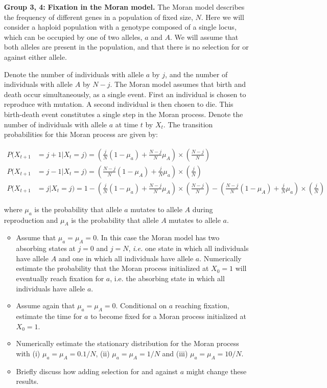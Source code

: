 \documentclass[12pt]{article}
\begin{document}
\begin{enumerate}
\item[\bf Group 3, 4:] {\bf Fixation in the Moran model.}  The Moran model describes the frequency of different genes in a population of fixed size, $N$.
Here we will consider a haploid population with a genotype composed of a single locus, which can be occupied by one of two alleles, $a$ and $A$. We will assume that both alleles are present in the population, and that there is no selection for or against either allele.

Denote the number of individuals with allele $a$ by $j$, and the number of individuals with allele $A$ by $N-j$. The Moran model assumes that birth and death occur simultaneously, as a single event. First an individual is chosen to reproduce with mutation. A second individual is then chosen to die. This birth-death event constitutes a single step in the Moran process. Denote the
number of individuals with allele $a$ at time $t$ by $X_t$. The transition probabilities for this Moran process are given by:

\hspace*{-1.5cm} 
\vbox{
\begin{align*}
P(X_{t+1} &= j+1 | X_{t} = j) = \left(\frac{j}{N}(1-\mu_a)+\frac{N-j}{N}\mu_A\right)\times\left(\frac{N-j}{N}\right) \\
P(X_{t+1} &= j-1 | X_{t} = j) =  \left(\frac{N-j}{N}(1-\mu_A)+\frac{j}{N}\mu_a\right)\times\left(\frac{j}{N}\right) \\
P(X_{t+1} &= j | X_{t} = j) = 1 -  \left(\frac{j}{N}(1-\mu_a)+\frac{N-j}{N}\mu_A\right)\times\left(\frac{N-j}{N}\right)- \left(\frac{N-j}{N}(1-\mu_A)+\frac{j}{N}\mu_a\right)\times\left(\frac{j}{N}\right)
\end{align*}
}

where $\mu_a$ is the probability that allele $a$ mutates to allele $A$ during reproduction and $\mu_A$ is the probability that allele $A$ mutates to allele $a$.   

\begin{itemize}
\item Assume that $\mu_a=\mu_A=0$. In this case the Moran model has two absorbing states at $j=0$ and $j=N$, \emph{i.e.} one state in which all individuals have allele $A$ and one in which all individuals have allele $a$. Numerically estimate the probability that the Moran process initialized at $X_0=1$ will eventually reach fixation for $a$, i.e. the absorbing state in which all individuals have allele $a$.
\item Assume again that $\mu_a=\mu_A=0$. Conditional on $a$ reaching fixation, estimate the time for $a$ to become fixed for a Moran process initialized at $X_0=1$.
\item Numerically estimate the stationary distribution for the Moran process with (i) $\mu_a=\mu_A=0.1/N$,  (ii) $\mu_a=\mu_A=1/N$ and  (iii) $\mu_a=\mu_A=10/N$.
\item Briefly discuss how adding selection for and against $a$ might change these results.
\end{itemize}

\end{enumerate}
\end{document}

